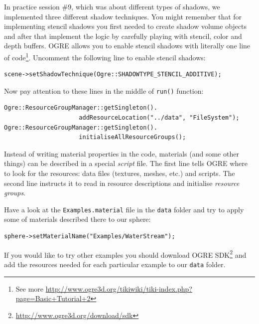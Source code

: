 \documentclass{article}
\begin{document}
In practice session \#9, which was about different types of shadows, we implemented three different shadow techniques. You might remember that for implementing stencil shadows you first needed to create shadow volume objects and after that implement the logic by carefully playing with stencil, color and depth buffers. OGRE allows you to enable stencil shadows with literally one line of code\footnote{See more \url{http://www.ogre3d.org/tikiwiki/tiki-index.php?page=Basic+Tutorial+2}}. Uncomment the following line to enable stencil shadows:
\begin{verbatim}
scene->setShadowTechnique(Ogre::SHADOWTYPE_STENCIL_ADDITIVE);
\end{verbatim}
Now pay attention to these lines in the middle of  \verb#run()# function:
\begin{verbatim}
Ogre::ResourceGroupManager::getSingleton().
                     addResourceLocation("../data", "FileSystem");
Ogre::ResourceGroupManager::getSingleton().
                     initialiseAllResourceGroups();
\end{verbatim}
Instead of writing material properties in the code, materials (and some other things) can be described in a special \emph{script} file. The first line tells OGRE where to look for the resources: data files (textures, meshes, etc.) and scripts. The second line instructs it to read in resource descriptions and initialise \emph{resource groups}.

Have a look at the \verb#Examples.material# file in the \verb#data# folder and try to apply some of materials described there to our sphere:
\begin{verbatim}
sphere->setMaterialName("Examples/WaterStream");
\end{verbatim} 
If you would like to try other examples you should download OGRE SDK\footnote{\url{http://www.ogre3d.org/download/sdk}} and add the resources needed for each particular example to our \verb#data# folder.
\end{document}
